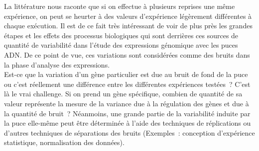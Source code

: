 \documentclass[a4paper,10pt]{article}
\begin{document}
La littérature nous raconte que si on effectue à plusieurs reprises une même expérience, on peut se heurter à des valeurs d’expérience légèrement différentes à chaque exécution.
Il est de ce fait très intéressant de voir de plus près les grandes étapes et les effets des processus biologiques qui sont derrières ces sources de quantité de variabilité dans l’étude des expressions génomique avec les puces ADN.
De ce point de vue, ces variations sont considérées comme des bruits dans la phase d’analyse des expressions.\\
Est-ce que la variation d’un gène particulier est due au bruit de fond de la puce ou c’est réellement une différence entre les différentes expériences testées ? C’est là le vrai challenge. 
Si on prend un gène spécifique, combien de quantité de sa valeur représente la mesure de la variance due à la régulation des gènes et due à la quantité de bruit ?
Néanmoins, une grande partie de la variabilité induite par la puce elle-même  peut être déterminée à l'aide des techniques 
de réplications ou d’autres techniques de séparations des bruits (Exemples : conception d’expérience statistique, normalisation des données). 
\end{document}
